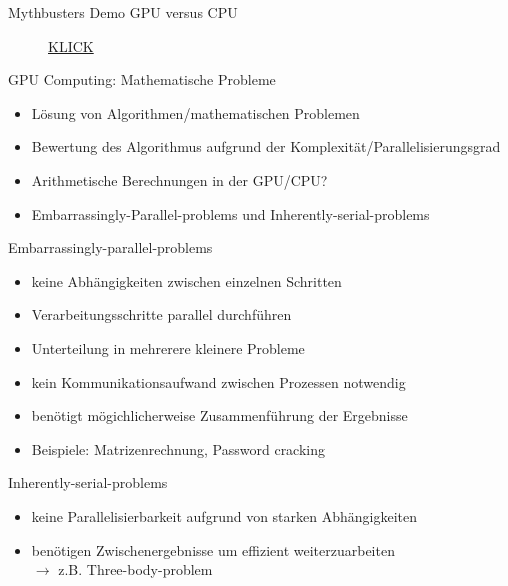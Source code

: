 \documentclass[10pt,aspectratio=169]{beamer}
\begin{document}
\begin{frame}{Mythbusters Demo GPU versus CPU}
    \begin{figure}[ht]
       \href{https://www.youtube.com/watch?v=-P28LKWTzrI}{KLICK}
    \end{figure}
\end{frame}


\begin{frame}{GPU Computing: Mathematische Probleme}
    \begin{itemize}
        
        \item Lösung von Algorithmen/mathematischen Problemen
        \item Bewertung des Algorithmus aufgrund der Komplexität/Parallelisierungsgrad
        \item Arithmetische Berechnungen in der GPU/CPU?
        \item Embarrassingly-Parallel-problems und Inherently-serial-problems
    
        \end{itemize}
\end{frame}

\begin{frame}{Embarrassingly-parallel-problems}
    \begin{itemize}
 
        \item keine Abhängigkeiten zwischen einzelnen Schritten 
        \item Verarbeitungsschritte parallel durchführen
        \item Unterteilung in mehrerere kleinere Probleme
        \item kein Kommunikationsaufwand zwischen Prozessen notwendig
        \item benötigt mögichlicherweise Zusammenführung der Ergebnisse
        \item Beispiele: Matrizenrechnung, Password cracking
    
        
    \end{itemize}
\end{frame}

\begin{frame}{Inherently-serial-problems}
    \begin{itemize}

        \item keine Parallelisierbarkeit aufgrund von starken Abhängigkeiten
        \item benötigen Zwischenergebnisse um effizient weiterzuarbeiten
        \\ $ \rightarrow $ 
        z.B. Three-body-problem
      
    \end{itemize}
\end{frame}
\end{document}
